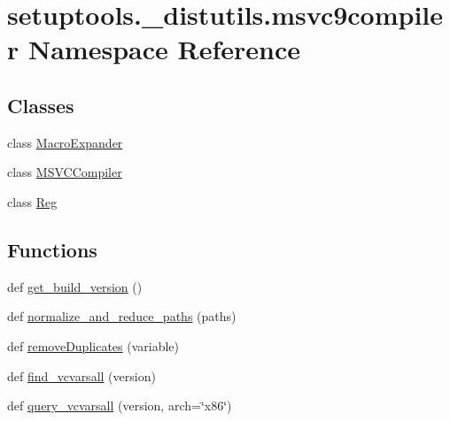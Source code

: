 \hypertarget{namespacesetuptools_1_1__distutils_1_1msvc9compiler}{}\section{setuptools.\+\_\+distutils.\+msvc9compiler Namespace Reference}
\label{namespacesetuptools_1_1__distutils_1_1msvc9compiler}
\subsection*{Classes}
\begin{DoxyCompactItemize}
\item 
class \hyperlink{classsetuptools_1_1__distutils_1_1msvc9compiler_1_1MacroExpander}{Macro\+Expander}
\item 
class \hyperlink{classsetuptools_1_1__distutils_1_1msvc9compiler_1_1MSVCCompiler}{M\+S\+V\+C\+Compiler}
\item 
class \hyperlink{classsetuptools_1_1__distutils_1_1msvc9compiler_1_1Reg}{Reg}
\end{DoxyCompactItemize}
\subsection*{Functions}
\begin{DoxyCompactItemize}
\item 
def \hyperlink{namespacesetuptools_1_1__distutils_1_1msvc9compiler_ac4367f7450a56ac581a75e82067a815d}{get\+\_\+build\+\_\+version} ()
\item 
def \hyperlink{namespacesetuptools_1_1__distutils_1_1msvc9compiler_ad5c2a4a0af506b05e108b8ec9689d1b9}{normalize\+\_\+and\+\_\+reduce\+\_\+paths} (paths)
\item 
def \hyperlink{namespacesetuptools_1_1__distutils_1_1msvc9compiler_a12fc5d2e326f661cd1c49c5003efe076}{remove\+Duplicates} (variable)
\item 
def \hyperlink{namespacesetuptools_1_1__distutils_1_1msvc9compiler_a7c6b6df5e6749e9b60b1e5d592b1acf9}{find\+\_\+vcvarsall} (version)
\item 
def \hyperlink{namespacesetuptools_1_1__distutils_1_1msvc9compiler_a97c300b2c4cda029520e92d5801036f9}{query\+\_\+vcvarsall} (version, arch=\char`\"{}x86\char`\"{})
\end{DoxyCompactItemize}
